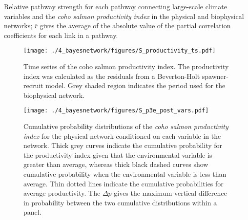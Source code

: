 \newpage
\begin{table}[!ht]
  \small \centering \libertineLF
  \caption[Relative pathway strength for each pathway connecting large-scale
           climate variables and the coho salmon productivity index.]{Relative
           pathway strength for each pathway connecting large-scale climate
           variables and the \emph{coho salmon productivity index} in the
           physical and biophysical networks; $\overline{r}$ gives the average
           of the absolute value of the partial correlation coefficients for
           each link in a pathway.}
  
  \label{tab:bn:s1}
\end{table}



\begin{figure}[htbp]
  \centering \texttt{[image: ./4\_bayesnetwork/figures/S\_productivity\_ts.pdf]}
  \caption[Time series of the coho salmon productivity index.]{Time series of
           the coho salmon productivity index. The productivity index was
           calculated as the residuals from a Beverton-Holt spawner-recruit
           model. Grey shaded region indicates the period used for the
           biophysical network.}
  \label{fig:bn:s1}
\end{figure}

\begin{figure}[htbp]
  \centering \texttt{[image: ./4\_bayesnetwork/figures/S\_p3e\_post\_vars.pdf]}
  \caption[Cumulative probability distributions of the coho salmon
           productivity index for the physical network conditioned on each
           variable in the network.]{Cumulative probability distributions of the
           \emph{coho salmon productivity index} for the physical network
           conditioned on each variable in the network. Thick grey curves
           indicate the cumulative probability for the productivity index given
           that the environmental variable is greater than average, whereas
           thick black dashed curves show cumulative probability when the
           environmental variable is less than average. Thin dotted lines
           indicate the cumulative probabilities for average productivity. The
           \(\Delta p\) gives the maximum vertical difference in probability
           between the two cumulative distributions within a panel.}
  \label{fig:bn:s2}
\end{figure}

